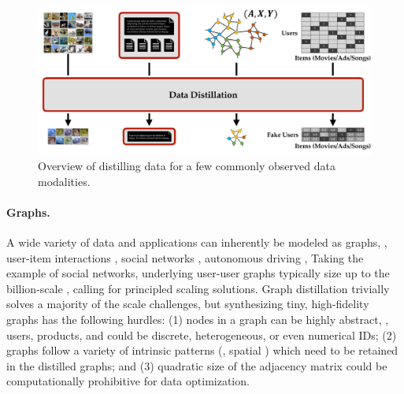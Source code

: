 \documentclass[10pt]{article} %
\begin{document}
\begin{figure}[t!] \centering
    \centering
    \includegraphics[width=0.8\linewidth]{figures/data_modalities.pdf}
    \renewcommand\figurename{\href{https://www.noveens.com/images/dd_survey/data_modalities.pdf}{[HQ Image Link]} Figure}
    \caption{Overview of distilling data for a few commonly observed data modalities.}
    \label{fig:data_modalities}
    \vspace{-10pt}
\end{figure}

\paragraph{Graphs.} A wide variety of data and applications can inherently be modeled as graphs, \eg, user-item interactions \citep{gnn_recsys_survey, eclare, reviews_sigir}, social networks \citep{gnn_social}, autonomous driving \citep{gnn_self_driving, gapformer}, \etc Taking the example of social networks, underlying user-user graphs typically size up to the billion-scale \citep{graph_billion}, calling for principled scaling solutions. Graph distillation trivially solves a majority of the scale challenges, but synthesizing tiny, high-fidelity graphs has the following hurdles: (1) nodes in a graph can be highly abstract, \eg, users, products, \etc and could be discrete, heterogeneous, or even numerical IDs; (2) graphs follow a variety of intrinsic patterns (\eg, spatial \citep{gcn}) which need to be retained in the distilled graphs; and (3) quadratic size of the adjacency matrix could be computationally prohibitive for data optimization.
\end{document}
